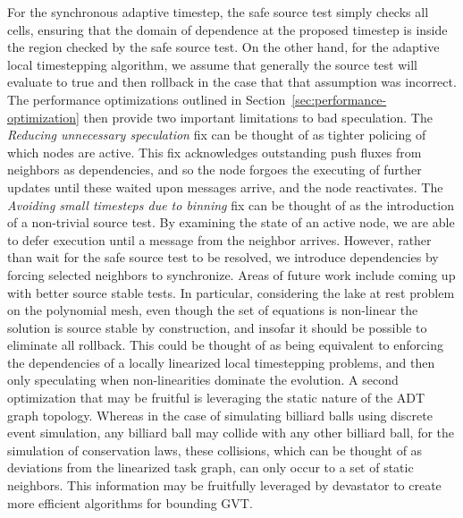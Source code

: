 For the synchronous adaptive timestep, the safe source test simply checks all cells, ensuring that the domain of dependence at the proposed timestep is inside the region checked by the safe source test. On the other hand, for the adaptive local timestepping algorithm, we assume that generally the source test will evaluate to true and then rollback in the case that that assumption was incorrect. The performance optimizations outlined in Section~\ref{sec:performance-optimization} then provide two important limitations to bad speculation. The {\em Reducing unnecessary speculation} fix can be thought of as tighter policing of which nodes are active. This fix acknowledges outstanding push fluxes from neighbors as dependencies, and so the node forgoes the executing of further updates until these waited upon messages arrive, and the node reactivates. The {\em Avoiding small timesteps due to binning} fix can be thought of as the introduction of a non-trivial source test. By examining the state of an active node, we are able to defer execution until a message from the neighbor arrives. However, rather than wait for the safe source test to be resolved, we introduce dependencies by forcing selected neighbors to synchronize. 
Areas of future work include coming up with better source stable tests. In particular, considering the lake at rest problem on the polynomial mesh, even though the set of equations is non-linear the solution is source stable by construction, and insofar it should be possible to eliminate all rollback. This could be thought of as being equivalent to enforcing the dependencies of a locally linearized local timestepping problems, and then only speculating when non-linearities dominate the evolution. A second optimization that may be fruitful is leveraging the static nature of the ADT graph topology. Whereas in the case of simulating billiard balls using discrete event simulation, any billiard ball may collide with any other billiard ball, for the simulation of conservation laws, these collisions, which can be thought of as deviations from the linearized task graph, can only occur to a set of static neighbors. This information may be fruitfully leveraged by devastator to create more efficient algorithms for bounding GVT.

